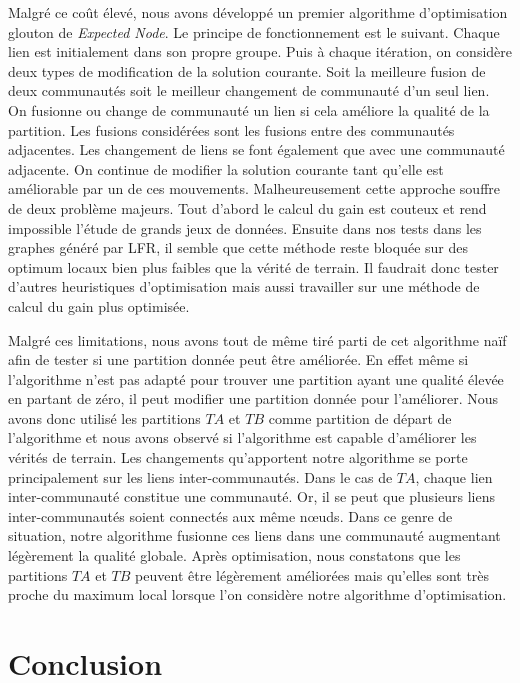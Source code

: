 Malgré ce coût élevé, nous avons développé un premier algorithme d'optimisation glouton de \emph{Expected Node}.
Le principe de fonctionnement est le suivant.
Chaque lien est initialement dans son propre groupe.
Puis à chaque itération, on considère deux types de modification de la solution courante.
Soit la meilleure fusion de deux communautés soit le meilleur changement de communauté d'un seul lien.
On fusionne ou change de communauté un lien si cela améliore la qualité de la partition.
Les fusions considérées sont les fusions entre des communautés adjacentes.
Les changement de liens se font également que avec une communauté adjacente.
On continue de modifier la solution courante tant qu'elle est améliorable par un de ces mouvements.
Malheureusement cette approche souffre de deux problème majeurs.
Tout d'abord le calcul du gain est couteux et rend impossible l'étude de grands jeux de données.
Ensuite dans nos tests dans les graphes généré par LFR, il semble que cette méthode reste bloquée sur des optimum locaux bien plus faibles que la vérité de terrain.
Il faudrait donc tester d'autres heuristiques d'optimisation mais aussi travailler sur une méthode de calcul du gain plus optimisée.

Malgré ces limitations, nous avons tout de même tiré parti de cet algorithme naïf afin de tester si une partition donnée peut être améliorée.
En effet même si l'algorithme n'est pas adapté pour trouver une partition ayant une qualité élevée en partant de zéro, il peut modifier une partition donnée pour l'améliorer. 
Nous avons donc utilisé les partitions $TA$ et $TB$ comme partition de départ de l'algorithme et nous avons observé si l'algorithme est capable d'améliorer les vérités de terrain.
Les changements qu'apportent notre algorithme se porte principalement sur les liens inter-communautés.
Dans le cas de $TA$, chaque lien inter-communauté constitue une communauté.
Or, il se peut que plusieurs liens inter-communautés soient connectés aux même n\oe uds.
Dans ce genre de situation, notre algorithme fusionne ces liens dans une communauté augmentant légèrement la qualité globale.
Après optimisation, nous constatons que les partitions $TA$ et $TB$ peuvent être légèrement améliorées mais qu'elles sont très proche du maximum local lorsque l'on considère notre algorithme d'optimisation.


\section{Conclusion}

